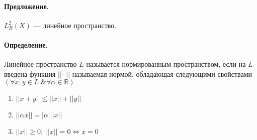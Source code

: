 \paragraph{Предложение.} $ L^2_R(X) $ --- линейное пространство.

\paragraph{Определение.} Линейное пространство $ L $ называется нормированным пространством, если на $ L $ введена функция $ ||\cdot|| $ называемая нормой, обладающая следующими свойствами $ (\forall x,y \in L\; \& \forall \alpha \in \mathbb{R}) $
\begin{enumerate}
	\item $ ||x+y|| \leqslant ||x|| + ||y|| $
	\item $ ||\alpha x|| = |\alpha| ||x|| $
	\item $ ||x|| \geqslant0,\; ||x|| =0 \Leftrightarrow x = 0 $
\end{enumerate}

